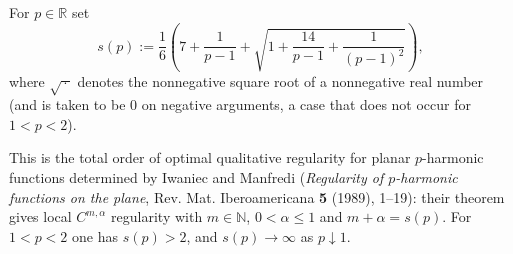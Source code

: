 \begin{definition}
For $p\in\mathbb{R}$ set
\[
  s(p):=\frac16\left(7+\frac1{p-1}+\sqrt{1+\frac{14}{p-1}+\frac1{(p-1)^2}}\right),
\]
where $\sqrt{\,\cdot\,}$ denotes the nonnegative square root of a nonnegative real number
(and is taken to be $0$ on negative arguments, a case that does not occur for $1<p<2$).

This is the total order of optimal qualitative regularity for planar $p$-harmonic functions
determined by Iwaniec and Manfredi (\emph{Regularity of $p$-harmonic functions on the plane},
Rev. Mat. Iberoamericana \textbf{5} (1989), 1--19): their theorem gives local
$C^{m,\alpha}$ regularity with $m\in\mathbb{N}$, $0<\alpha\le1$ and $m+\alpha=s(p)$.  For
$1<p<2$ one has $s(p)>2$, and $s(p)\to\infty$ as $p\downarrow1$.
\end{definition}
